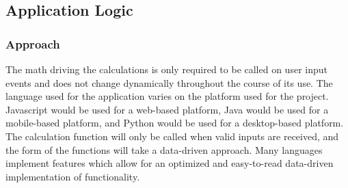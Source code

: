 \documentclass[onecolumn, draftclsnofoot,10pt, compsoc]{IEEEtran}
\begin{document}
\subsection{Application Logic}
\subsubsection{Approach}
The math driving the calculations is only required to be called on user input events and does not change dynamically throughout the course of its use.
The language used for the application varies on the platform used for the project.
Javascript would be used for a web-based platform, Java would be used for a mobile-based platform, and Python would be used for a desktop-based platform.
The calculation function will only be called when valid inputs are received, and the form of the functions will take a data-driven approach.
Many languages implement features which allow for an optimized and easy-to-read data-driven implementation of functionality.
\end{document}
